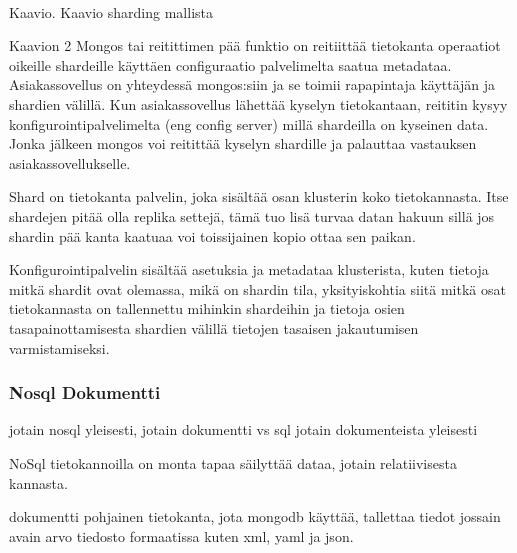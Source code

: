 \\
Kaavio\getChartCount{}. Kaavio sharding mallista 
\medskip




Kaavion 2 Mongos tai reitittimen pää funktio on reitiittää tietokanta operaatiot oikeille shardeille käyttäen configuraatio palvelimelta saatua metadataa.
Asiakassovellus on yhteydessä mongos:siin ja se toimii rapapintaja käyttäjän ja shardien välillä. 
%
Kun asiakassovellus lähettää kyselyn tietokantaan, reititin kysyy konfigurointipalvelimelta (eng config server) millä shardeilla on kyseinen data. 
Jonka jälkeen mongos voi reitittää kyselyn shardille ja palauttaa vastauksen asiakassovellukselle.
\medskip

Shard on tietokanta palvelin, joka sisältää osan klusterin koko tietokannasta.
Itse shardejen pitää olla replika settejä, 
tämä tuo lisä turvaa datan hakuun sillä jos shardin pää kanta kaatuaa voi toissijainen kopio ottaa sen paikan. 
\medskip



Konfigurointipalvelin sisältää asetuksia ja metadataa klusterista, 
kuten tietoja mitkä shardit ovat olemassa, mikä on shardin tila,
yksityiskohtia siitä mitkä osat tietokannasta on tallennettu mihinkin shardeihin
ja tietoja osien tasapainottamisesta shardien välillä tietojen tasaisen jakautumisen varmistamiseksi.


\iffalse

\subsubsection{Nosql Dokumentti}



jotain nosql yleisesti, jotain dokumentti vs sql
jotain dokumenteista yleisesti

\medskip

NoSql tietokannoilla on monta tapaa säilyttää dataa, jotain relatiivisesta kannasta. 

dokumentti pohjainen tietokanta, jota mongodb käyttää, tallettaa tiedot jossain avain arvo tiedosto formaatissa kuten xml, yaml ja json. \citemissing
\medskip


